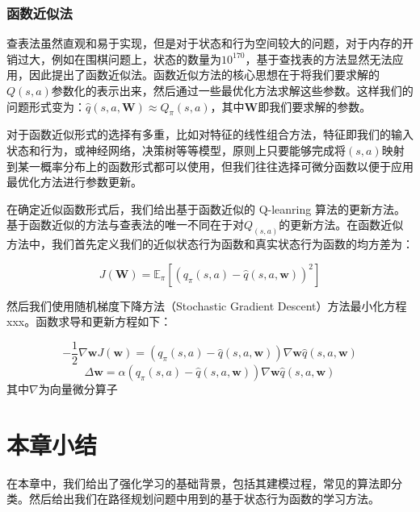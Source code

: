 \documentclass{standalone}
\begin{document}
\subsubsection{函数近似法}
查表法虽然直观和易于实现，但是对于状态和行为空间较大的问题，对于内存的开销过大，例如在围棋问题上，状态的数量为$10^{170}$，基于查找表的方法显然无法应用，因此提出了函数近似法。函数近似方法的核心思想在于将我们要求解的$Q(s, a)$参数化的表示出来，然后通过一些最优化方法求解这些参数。这样我们的问题形式变为：$\hat{q}(s, a, \mathbf{W}) \approx Q_{\pi}(s, a)$，其中$\mathbf{W}$即我们要求解的参数。\par
对于函数近似形式的选择有多重，比如对特征的线性组合方法，特征即我们的输入状态和行为，或神经网络，决策树等等模型，原则上只要能够完成将$(s, a)$映射到某一概率分布上的函数形式都可以使用，但我们往往选择可微分函数以便于应用最优化方法进行参数更新。\par
在确定近似函数形式后，我们给出基于函数近似的 Q-leanring 算法的更新方法。基于函数近似的方法与查表法的唯一不同在于对$Q_(s, a)$的更新方法。在函数近似方法中，我们首先定义我们的近似状态行为函数和真实状态行为函数的均方差为：
\begin{center}
    \begin{equation}
        J(\mathbf{W}) = \mathbb{E}_{\pi}[(q_{\pi}(s,a) - \hat{q}(s, a, \mathbf{w}))^2]
    \end{equation}
\end{center}
然后我们使用随机梯度下降方法（Stochastic Gradient Descent）方法最小化方程 xxx。函数求导和更新方程如下：
\begin{center}
    \begin{equation}
        -\frac{1}{2}\nabla{\mathbf{w}}J(\mathbf{w}) = (q_{\pi}(s, a)-\hat{q}(s, a, \mathbf{w}))\nabla{\mathbf{w}} \hat{q}(s, a, \mathbf{w})
    \end{equation}
    \begin{equation}
        \Delta\mathbf{w} = \alpha(q_{\pi}(s, a) - \hat{q}(s, a, \mathbf{w}))\nabla{\mathbf{w}} \hat{q}(s, a, \mathbf{w})
    \end{equation}
    \mbox{其中$\nabla$为向量微分算子}
\end{center}

\section{本章小结}
在本章中，我们给出了强化学习的基础背景，包括其建模过程，常见的算法即分类。然后给出我们在路径规划问题中用到的基于状态行为函数的学习方法。
\end{document}
